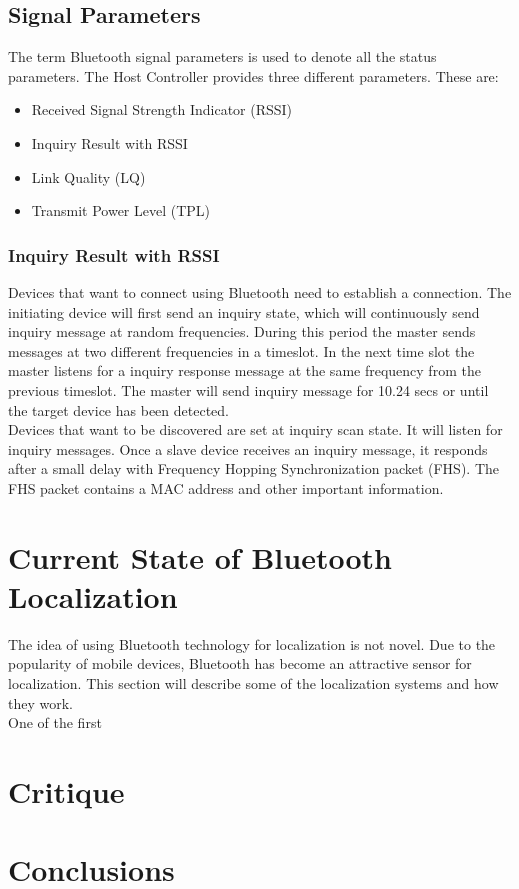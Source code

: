 \documentclass[12pt]{article}
\begin{document}
\subsection{Signal Parameters}

The term Bluetooth signal parameters is used to denote all the status parameters. The Host Controller provides three different parameters. These are:

\begin{itemize}
  \item Received Signal Strength Indicator (RSSI)
  \item Inquiry Result with RSSI
  \item Link Quality (LQ)
  \item Transmit Power Level (TPL)
\end{itemize}

\subsubsection{Inquiry Result with RSSI}
Devices that want to connect using Bluetooth need to establish a connection. The initiating device will first send an inquiry state, which will continuously send inquiry message at random frequencies. During this period the master sends messages at two different frequencies in a timeslot. In the next time slot the master listens for a inquiry response message at the same frequency from the previous timeslot. The master will send inquiry message for 10.24 secs or until the target device has been detected. \\

Devices that want to be discovered are set at inquiry scan state. It will listen for inquiry messages. Once a slave device receives an inquiry message, it responds after a small delay with Frequency Hopping Synchronization packet (FHS). The FHS packet contains a MAC address and other important information. \\



\section{Current State of Bluetooth Localization}
The idea of using Bluetooth technology for localization is not novel. Due to the popularity of mobile devices, Bluetooth has become an attractive sensor for localization. This section will describe some of the localization systems and how they work. \\ 

One of the first 



\section*{Critique}


\section*{Conclusions}



\nocite{*}
\end{document}
